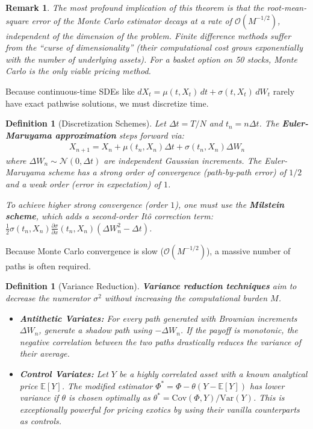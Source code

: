 \documentclass{report}
\theoremstyle{spacedplain}
\theoremstyle{spaceddefinition}
\newtheorem{definition}[theorem]{Definition}
\theoremstyle{spacedremark}
\newtheorem{remark}[theorem]{Remark}
\begin{document}
\begin{remark}
The most profound implication of this theorem is that the root-mean-square error of the Monte Carlo estimator decays at a rate of $\mathcal{O}(M^{-1/2})$, independent of the dimension of the problem. Finite difference methods suffer from the ``curse of dimensionality'' (their computational cost grows exponentially with the number of underlying assets). For a basket option on 50 stocks, Monte Carlo is the only viable pricing method.
\end{remark}

Because continuous-time SDEs like $dX_t = \mu(t,X_t)\,dt + \sigma(t,X_t)\,dW_t$ rarely have exact pathwise solutions, we must discretize time. 

\begin{definition}[Discretization Schemes]
Let $\Delta t = T/N$ and $t_n = n\Delta t$. The \textbf{Euler-Maruyama approximation} steps forward via:
\begin{align}
    X_{n+1} = X_n + \mu(t_n,X_n)\Delta t + \sigma(t_n,X_n)\Delta W_n
\end{align}
where $\Delta W_n \sim \mathcal{N}(0,\Delta t)$ are independent Gaussian increments. The Euler-Maruyama scheme has a strong order of convergence (path-by-path error) of $1/2$ and a weak order (error in expectation) of $1$. 

To achieve higher strong convergence (order $1$), one must use the \textbf{Milstein scheme}, which adds a second-order It\^o correction term: $\frac{1}{2}\sigma(t_n, X_n) \frac{\partial \sigma}{\partial x}(t_n, X_n) (\Delta W_n^2 - \Delta t)$.
\end{definition}

Because Monte Carlo convergence is slow ($\mathcal{O}(M^{-1/2})$), a massive number of paths is often required. 

\begin{definition}[Variance Reduction]
\textbf{Variance reduction techniques} aim to decrease the numerator $\sigma^2$ without increasing the computational burden $M$. 
\begin{itemize}
    \item \textbf{Antithetic Variates:} For every path generated with Brownian increments $\Delta W_n$, generate a shadow path using $-\Delta W_n$. If the payoff is monotonic, the negative correlation between the two paths drastically reduces the variance of their average.
    \item \textbf{Control Variates:} Let $Y$ be a highly correlated asset with a known analytical price $\mathbb{E}[Y]$. The modified estimator $\Phi^\ast = \Phi - \theta(Y - \mathbb{E}[Y])$ has lower variance if $\theta$ is chosen optimally as $\theta^\ast = \mathrm{Cov}(\Phi,Y)/\mathrm{Var}(Y)$. This is exceptionally powerful for pricing exotics by using their vanilla counterparts as controls.
\end{itemize}
\end{definition}
\end{document}
